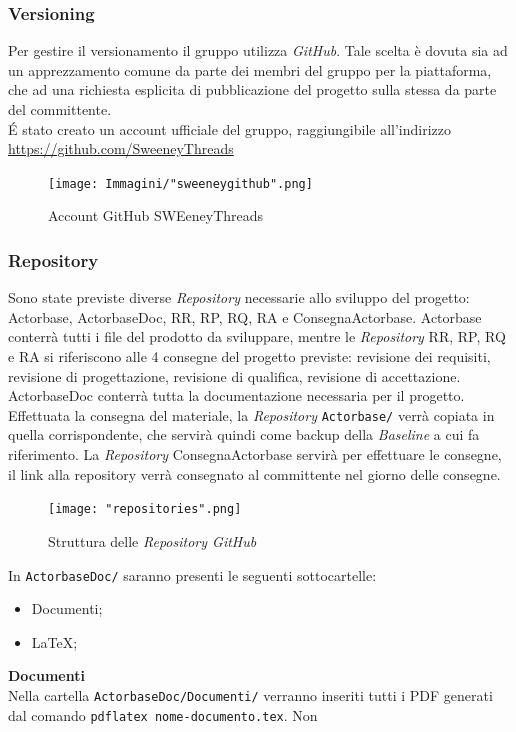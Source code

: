 \documentclass[a4paper]{article}
\begin{document}
	\subsubsection{Versioning}
	Per gestire il versionamento il gruppo utilizza \emph{GitHub}. Tale scelta è dovuta sia ad un apprezzamento
	comune da parte dei membri del gruppo per la piattaforma, che ad una richiesta esplicita di pubblicazione del
	progetto sulla stessa da parte del committente. \\
	\'E stato creato un account ufficiale del gruppo, raggiungibile all'indirizzo
	\url{https://github.com/SweeneyThreads}
	\begin{figure}[H]
		\centering
		\texttt{[image: Immagini/"sweeneygithub".png]}
		\caption{Account GitHub SWEeneyThreads}
	\end{figure}
		\subsubsection{Repository}
	Sono state previste diverse \emph{Repository} necessarie allo sviluppo del progetto: Actorbase, ActorbaseDoc, RR, RP, RQ, RA e ConsegnaActorbase. 	
    Actorbase conterrà tutti i file del prodotto da sviluppare, mentre le \emph{Repository} RR, RP, RQ e RA si riferiscono alle 4 consegne del 
    progetto previste: revisione dei requisiti, revisione di progettazione, revisione di qualifica, revisione di accettazione.
    ActorbaseDoc conterrà tutta la documentazione necessaria per il progetto.  
    Effettuata la consegna del materiale, la \emph{Repository} \verb|Actorbase/| verrà copiata in quella corrispondente, che servirà quindi come 
    backup della \emph{Baseline} a cui fa riferimento.
    La \emph{Repository} ConsegnaActorbase servirà per effettuare le consegne, il link alla repository verrà consegnato al committente nel giorno delle 
    consegne.
  	\begin{figure}[H]
		\centering
		\texttt{[image: "repositories".png]}
		\caption{Struttura delle \emph{Repository GitHub}}
	\end{figure}
	In \verb|ActorbaseDoc/| saranno presenti le seguenti sottocartelle:
	\begin{itemize}
		\item Documenti;
		\item LaTeX;
	\end{itemize}
	\textbf{Documenti} \\
	Nella cartella \verb|ActorbaseDoc/Documenti/| verranno inseriti tutti i PDF generati dal comando \verb|pdflatex nome-documento.tex|. Non
\end{document}
